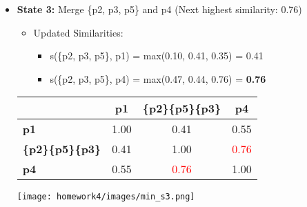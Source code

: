 \documentclass[11pt]{article}
\begin{document}
\begin{enumerate}
\begin{enumerate}
\begin{itemize}
        \item \textbf{State 3:} Merge \{p2, p3, p5\} and p4 (Next highest similarity: 0.76)

        \begin{itemize}
        \item Updated Similarities:
        \begin{itemize}
            \item s(\{p2, p3, p5\}, p1) = max(0.10, 0.41, 0.35) = 0.41
            \item s(\{p2, p3, p5\}, p4) = max(0.47, 0.44, 0.76) = \textbf{0.76} \\
        \end{itemize}
    \end{itemize}
    
\begin{table}[H]
        \centering
        \begin{minipage}{0.75\textwidth}  %
            \centering
            \begin{minipage}{0.4\textwidth}
                \centering
                \label{tb:exp1}
                \begin{tabular}{ l| c | c | c}\hline
                           & \textbf{p1} & \textbf{\{p2\}}\textbf{\{p5\}}\textbf{\{p3\}} & \textbf{p4} \\ \hline
                    \bf p1                 & 1.00        & 0.41        & 0.55               \\
                    \bf \{p2\}\{p5\}\{p3\} & 0.41        & 1.00        & \textcolor{red}{0.76}                           \\
                    \bf p4                 & 0.55        & \textcolor{red}{0.76}        & 1.00               \\
                    \hline
                \end{tabular}
            \end{minipage}%
            \hfill
            \begin{minipage}{0.28\textwidth}
                \centering
                \texttt{[image: homework4/images/min\_s3.png]}
                \label{fig:your-image}
            \end{minipage}
        \end{minipage}
    \end{table}


\end{itemize}
\end{enumerate}
\end{enumerate}
\end{document}
